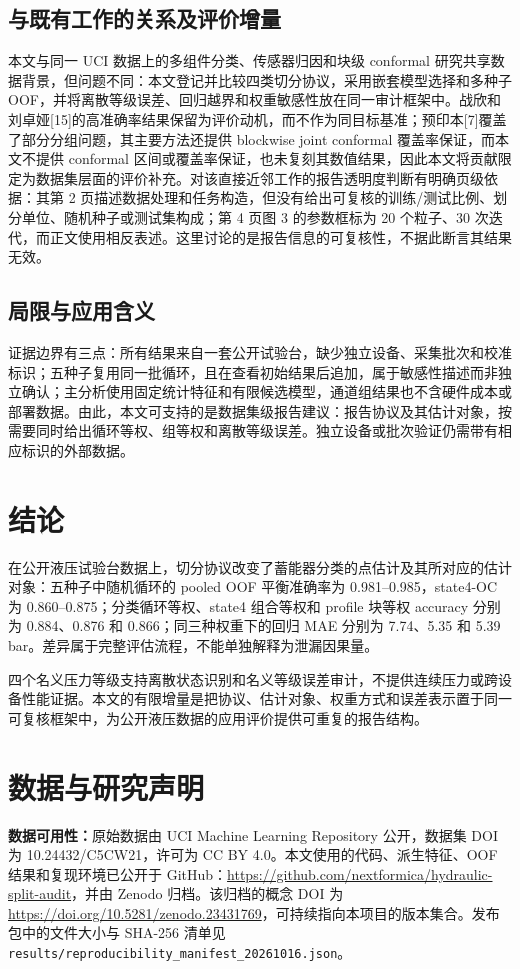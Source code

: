 \documentclass[UTF8,12pt,a4paper]{ctexart}
\begin{document}
\subsection{与既有工作的关系及评价增量}
本文与同一 UCI 数据上的多组件分类、传感器归因和块级 conformal 研究共享数据背景，但问题不同：本文登记并比较四类切分协议，采用嵌套模型选择和多种子 OOF，并将离散等级误差、回归越界和权重敏感性放在同一审计框架中。战欣和刘卓娅[15]的高准确率结果保留为评价动机，而不作为同目标基准；预印本[7]覆盖了部分分组问题，其主要方法还提供 blockwise joint conformal 覆盖率保证，而本文不提供 conformal 区间或覆盖率保证，也未复刻其数值结果，因此本文将贡献限定为数据集层面的评价补充。对该直接近邻工作的报告透明度判断有明确页级依据：其第 2 页描述数据处理和任务构造，但没有给出可复核的训练/测试比例、划分单位、随机种子或测试集构成；第 4 页图 3 的参数框标为 20 个粒子、30 次迭代，而正文使用相反表述。这里讨论的是报告信息的可复核性，不据此断言其结果无效。

\subsection{局限与应用含义}
证据边界有三点：所有结果来自一套公开试验台，缺少独立设备、采集批次和校准标识；五种子复用同一批循环，且在查看初始结果后追加，属于敏感性描述而非独立确认；主分析使用固定统计特征和有限候选模型，通道组结果也不含硬件成本或部署数据。由此，本文可支持的是数据集级报告建议：报告协议及其估计对象，按需要同时给出循环等权、组等权和离散等级误差。独立设备或批次验证仍需带有相应标识的外部数据。

\section{结论}
在公开液压试验台数据上，切分协议改变了蓄能器分类的点估计及其所对应的估计对象：五种子中随机循环的 pooled OOF 平衡准确率为 0.981–0.985，state4-OC 为 0.860–0.875；分类循环等权、state4 组合等权和 profile 块等权 accuracy 分别为 0.884、0.876 和 0.866；同三种权重下的回归 MAE 分别为 7.74、5.35 和 5.39 bar。差异属于完整评估流程，不能单独解释为泄漏因果量。

四个名义压力等级支持离散状态识别和名义等级误差审计，不提供连续压力或跨设备性能证据。本文的有限增量是把协议、估计对象、权重方式和误差表示置于同一可复核框架中，为公开液压数据的应用评价提供可重复的报告结构。

\section*{数据与研究声明}
\textbf{数据可用性：}原始数据由 UCI Machine Learning Repository 公开，数据集 DOI 为 10.24432/C5CW21，许可为 CC BY 4.0。本文使用的代码、派生特征、OOF 结果和复现环境已公开于 GitHub：\url{https://github.com/nextformica/hydraulic-split-audit}，并由 Zenodo 归档。该归档的概念 DOI 为 \url{https://doi.org/10.5281/zenodo.23431769}，可持续指向本项目的版本集合。发布包中的文件大小与 SHA-256 清单见 \texttt{results/reproducibility\_manifest\_20261016.json}。
\end{document}
